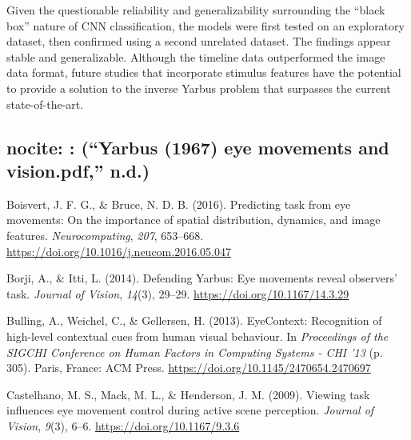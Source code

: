 \documentclass[
  english,
  man]{apa6}
\begin{document}
Given the questionable reliability and generalizability surrounding the \enquote{black box} nature of CNN classification, the models were first tested on an exploratory dataset, then confirmed using a second unrelated dataset. The findings appear stable and generalizable. Although the timeline data outperformed the image data format, future studies that incorporate stimulus features have the potential to provide a solution to the inverse Yarbus problem that surpasses the current state-of-the-art.

\hypertarget{section}{%
\subsection{\texorpdfstring{\newpage}{}}\label{section}}

\hypertarget{nocite-yarbus1967eye}{%
\subsection{nocite: : (``Yarbus (1967) eye movements and vision.pdf,'' n.d.)}\label{nocite-yarbus1967eye}}

\begingroup
\setlength{\parindent}{-0.5in}
\setlength{\leftskip}{0.5in}

\hypertarget{refs}{}
\leavevmode\hypertarget{ref-boisvertPredictingTaskEye2016}{}%
Boisvert, J. F. G., \& Bruce, N. D. B. (2016). Predicting task from eye movements: On the importance of spatial distribution, dynamics, and image features. \emph{Neurocomputing}, \emph{207}, 653--668. \url{https://doi.org/10.1016/j.neucom.2016.05.047}

\leavevmode\hypertarget{ref-borjiDefendingYarbusEye2014a}{}%
Borji, A., \& Itti, L. (2014). Defending Yarbus: Eye movements reveal observers' task. \emph{Journal of Vision}, \emph{14}(3), 29--29. \url{https://doi.org/10.1167/14.3.29}

\leavevmode\hypertarget{ref-bullingEyeContextRecognitionHighlevel2013}{}%
Bulling, A., Weichel, C., \& Gellersen, H. (2013). EyeContext: Recognition of high-level contextual cues from human visual behaviour. In \emph{Proceedings of the SIGCHI Conference on Human Factors in Computing Systems - CHI '13} (p. 305). Paris, France: ACM Press. \url{https://doi.org/10.1145/2470654.2470697}

\leavevmode\hypertarget{ref-castelhanoViewingTaskInfluences2009}{}%
Castelhano, M. S., Mack, M. L., \& Henderson, J. M. (2009). Viewing task influences eye movement control during active scene perception. \emph{Journal of Vision}, \emph{9}(3), 6--6. \url{https://doi.org/10.1167/9.3.6}
\end{document}

